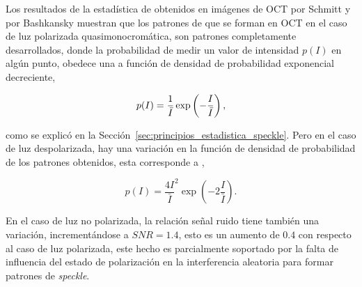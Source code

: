 Los resultados de la estadística de \speckle obtenidos en imágenes de OCT por Schmitt \etal \cite{Schmitt1999} y por Bashkansky \etal \cite{Bashkansky2000} muestran que los patrones de \speckle que se forman en OCT en el caso de luz polarizada quasimonocromática, son patrones completamente desarrollados, donde la probabilidad de medir un valor de intensidad $p(I)$ en algún punto, obedece una a función de densidad de probabilidad exponencial decreciente,

\begin{equation}
p(I) = \frac{1}{\bar{I}}\exp\left(-\frac{I}{\bar{I}}\right), \notag
\end{equation}

\noindent como se explicó en la Sección~\ref{sec:principios_estadistica_speckle}. Pero en el caso de luz despolarizada, hay una variación en la función de densidad de probabilidad de los patrones obtenidos, esta corresponde a \cite{Bashkansky2000},

\begin{equation}
\label{eq:p_i_oct}
p(I) = \frac{4I}{\bar{I}}^2\exp\left(-2\frac{I}{\bar{I}}\right).
\end{equation}

\noindent En el caso de luz no polarizada, la relación señal ruido tiene también una variación, incrementándose a $SNR=1.4$, esto es un aumento de $0.4$ con respecto al caso de luz polarizada, este hecho es parcialmente soportado por la falta de influencia del estado de polarización en la interferencia aleatoria para formar patrones de \textit{speckle}.


